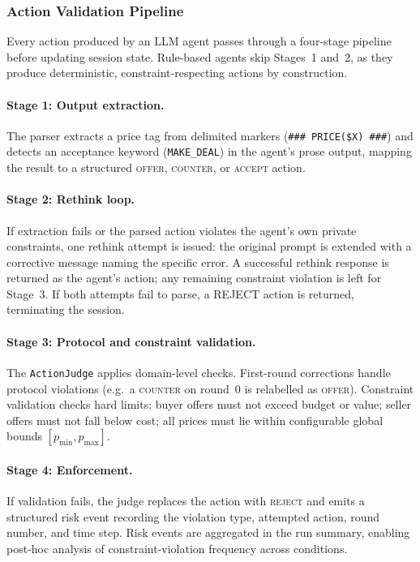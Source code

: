 \subsubsection{Action Validation Pipeline}
\label{sec:validation}

Every action produced by an LLM agent passes through a four-stage pipeline before updating session state.  Rule-based agents skip Stages~1 and~2, as they produce deterministic, constraint-respecting actions by construction.

\paragraph{Stage 1: Output extraction.}
The parser extracts a price tag from delimited markers (\texttt{\#\#\# PRICE(\$X) \#\#\#}) and detects an acceptance keyword (\texttt{MAKE\_DEAL}) in the agent's prose output, mapping the result to a structured \textsc{offer}, \textsc{counter}, or \textsc{accept} action.

\paragraph{Stage 2: Rethink loop.}
If extraction fails or the parsed action violates the agent's own private constraints, one rethink attempt is issued: the original prompt is extended with a corrective message naming the specific error.  A successful rethink response is returned as the agent's action; any remaining constraint violation is left for Stage~3.  If both attempts fail to parse, a \textsc{REJECT} action is returned, terminating the session.

\paragraph{Stage 3: Protocol and constraint validation.}
The \texttt{ActionJudge} applies domain-level checks.  First-round corrections handle protocol violations (e.g.\ a \textsc{counter} on round~0 is relabelled as \textsc{offer}).  Constraint validation checks hard limits: buyer offers must not exceed budget or value; seller offers must not fall below cost; all prices must lie within configurable global bounds $[p_{\min}, p_{\max}]$.

\paragraph{Stage 4: Enforcement.}
If validation fails, the judge replaces the action with \textsc{reject} and emits a structured risk event recording the violation type, attempted action, round number, and time step.  Risk events are aggregated in the run summary, enabling post-hoc analysis of constraint-violation frequency across conditions.

